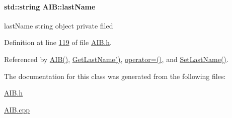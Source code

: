 \paragraph[{\texorpdfstring{last\+Name}{lastName}}]{\setlength{\rightskip}{0pt plus 5cm}std\+::string A\+I\+B\+::last\+Name\hspace{0.3cm}{\ttfamily [private]}}\hypertarget{class_a_i_b_ace7b8b648d1b44b7ee2f4be002952b7a_ace7b8b648d1b44b7ee2f4be002952b7a}{}\label{class_a_i_b_ace7b8b648d1b44b7ee2f4be002952b7a_ace7b8b648d1b44b7ee2f4be002952b7a}
last\+Name string object private filed 

Definition at line \hyperlink{_a_i_b_8h_source_l00119}{119} of file \hyperlink{_a_i_b_8h_source}{A\+I\+B.\+h}.



Referenced by \hyperlink{_a_i_b_8h_source_l00028}{A\+I\+B()}, \hyperlink{_a_i_b_8cpp_source_l00108}{Get\+Last\+Name()}, \hyperlink{_a_i_b_8h_source_l00078}{operator=()}, and \hyperlink{_a_i_b_8cpp_source_l00102}{Set\+Last\+Name()}.



The documentation for this class was generated from the following files\+:\begin{DoxyCompactItemize}
\item 
\hyperlink{_a_i_b_8h}{A\+I\+B.\+h}\item 
\hyperlink{_a_i_b_8cpp}{A\+I\+B.\+cpp}\end{DoxyCompactItemize}
